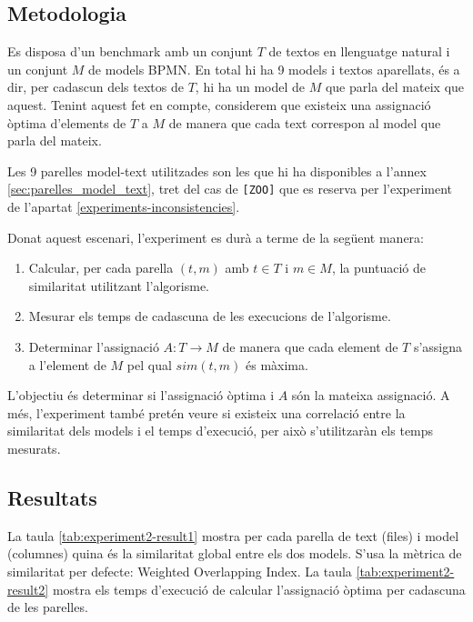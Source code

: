 \subsection{Metodologia}

Es disposa d'un benchmark amb un conjunt $T$ de textos en llenguatge natural i un conjunt $M$ de models BPMN. En total hi ha 9 models i textos aparellats, és a dir, per cadascun dels textos de $T$, hi ha un model de $M$ que parla del mateix que aquest. Tenint aquest fet en compte, considerem que existeix una assignació òptima d'elements de $T$ a $M$ de manera que cada text correspon al model que parla del mateix.

Les 9 parelles model-text utilitzades son les que hi ha disponibles a l'annex \ref{sec:parelles_model_text}, tret del cas de \texttt{[ZOO]} que es reserva per l'experiment de l'apartat \ref{experiments-inconsistencies}. 

Donat aquest escenari, l'experiment es durà a terme de la següent manera:

\begin{enumerate}
    \item Calcular, per cada parella $(t, m)$ amb $t \in T$ i $m \in M$, la puntuació de similaritat utilitzant l'algorisme.
    \item Mesurar els temps de cadascuna de les execucions de l'algorisme.
    \item Determinar l'assignació $A: T \rightarrow M$ de manera que cada element de $T$ s'assigna a l'element de $M$ pel qual $sim(t, m)$ és màxima.
\end{enumerate}

L'objectiu és determinar si l'assignació òptima i $A$ són la mateixa assignació. A més, l'experiment també pretén veure si existeix una correlació entre la similaritat dels models i el temps d'execució, per això s'utilitzaràn els temps mesurats.

\subsection{Resultats}

La taula \ref{tab:experiment2-result1} mostra per cada parella de text (files) i model (columnes) quina és la similaritat global entre els dos models. S'usa la mètrica de similaritat per defecte: Weighted Overlapping Index. La taula \ref{tab:experiment2-result2} mostra els temps d'execució de calcular l'assignació òptima per cadascuna de les parelles.

